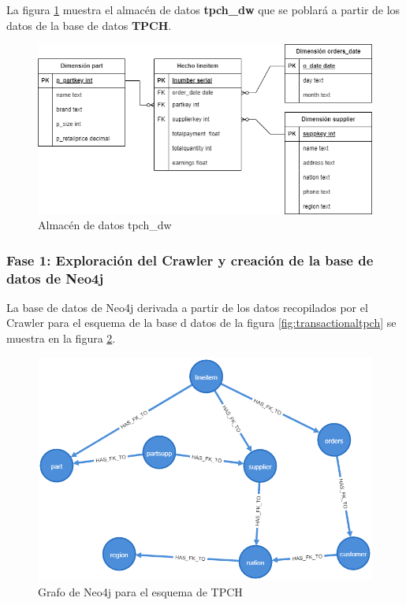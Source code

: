La figura \ref{fig:warehousetpch} muestra el almacén de datos \textbf{tpch\_dw} que se poblar\'a a partir de los 
datos de la base de datos \textbf{TPCH}.

\begin{figure}[H]
  \centering
  \includegraphics[scale=0.5]{Graphics/tpch-tpch-warehouse.drawio.png}
  \caption{Almacén de datos tpch\_dw}
  \label{fig:warehousetpch}
\end{figure}

\subsubsection{Fase 1: Exploraci\'on del Crawler y creaci\'on de la base de datos de Neo4j}

La base de datos de Neo4j derivada a 
partir de los datos recopilados por el Crawler para el esquema de la base d datos de la figura 
\ref{fig:transactionaltpch} se muestra en la figura \ref{fig:catalogexp2}.

\begin{figure}[H]
  \centering
  \includegraphics[scale=0.4]{Graphics/graph (2).png}
  \caption{Grafo de Neo4j para el esquema de TPCH}
  \label{fig:catalogexp2}
\end{figure}


